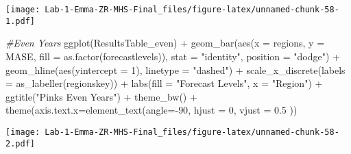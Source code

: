\documentclass[
]{article}
\newenvironment{Shaded}{\begin{snugshade}}{\end{snugshade}}
\newcommand{\AttributeTok}[1]{\textcolor[rgb]{0.77,0.63,0.00}{#1}}
\newcommand{\CommentTok}[1]{\textcolor[rgb]{0.56,0.35,0.01}{\textit{#1}}}
\newcommand{\DecValTok}[1]{\textcolor[rgb]{0.00,0.00,0.81}{#1}}
\newcommand{\FloatTok}[1]{\textcolor[rgb]{0.00,0.00,0.81}{#1}}
\newcommand{\FunctionTok}[1]{\textcolor[rgb]{0.00,0.00,0.00}{#1}}
\newcommand{\NormalTok}[1]{#1}
\newcommand{\SpecialCharTok}[1]{\textcolor[rgb]{0.00,0.00,0.00}{#1}}
\newcommand{\StringTok}[1]{\textcolor[rgb]{0.31,0.60,0.02}{#1}}
\begin{document}
\texttt{[image: Lab-1-Emma-ZR-MHS-Final\_files/figure-latex/unnamed-chunk-58-1.pdf]}

\begin{Shaded}
\begin{Highlighting}[]
\CommentTok{\#Even Years }
\FunctionTok{ggplot}\NormalTok{(ResultsTable\_even) }\SpecialCharTok{+} 
  \FunctionTok{geom\_bar}\NormalTok{(}\FunctionTok{aes}\NormalTok{(}\AttributeTok{x =}\NormalTok{ regions, }\AttributeTok{y =}\NormalTok{ MASE, }\AttributeTok{fill =} \FunctionTok{as.factor}\NormalTok{(forecastlevels)), }\AttributeTok{stat =} \StringTok{"identity"}\NormalTok{, }\AttributeTok{position =} \StringTok{"dodge"}\NormalTok{) }\SpecialCharTok{+} 
  \FunctionTok{geom\_hline}\NormalTok{(}\FunctionTok{aes}\NormalTok{(}\AttributeTok{yintercept =} \DecValTok{1}\NormalTok{), }\AttributeTok{linetype =} \StringTok{"dashed"}\NormalTok{) }\SpecialCharTok{+} 
  \FunctionTok{scale\_x\_discrete}\NormalTok{(}\AttributeTok{labels =} \FunctionTok{as\_labeller}\NormalTok{(regionskey)) }\SpecialCharTok{+}
  \FunctionTok{labs}\NormalTok{(}\AttributeTok{fill =} \StringTok{"Forecast Levels"}\NormalTok{, }\AttributeTok{x =} \StringTok{"Region"}\NormalTok{) }\SpecialCharTok{+} 
  \FunctionTok{ggtitle}\NormalTok{(}\StringTok{"Pinks Even Years"}\NormalTok{) }\SpecialCharTok{+} \FunctionTok{theme\_bw}\NormalTok{() }\SpecialCharTok{+} \FunctionTok{theme}\NormalTok{(}\AttributeTok{axis.text.x=}\FunctionTok{element\_text}\NormalTok{(}\AttributeTok{angle=}\SpecialCharTok{{-}}\DecValTok{90}\NormalTok{, }\AttributeTok{hjust =} \DecValTok{0}\NormalTok{, }\AttributeTok{vjust =} \FloatTok{0.5}\NormalTok{ ))}
\end{Highlighting}
\end{Shaded}

\texttt{[image: Lab-1-Emma-ZR-MHS-Final\_files/figure-latex/unnamed-chunk-58-2.pdf]}
\end{document}
